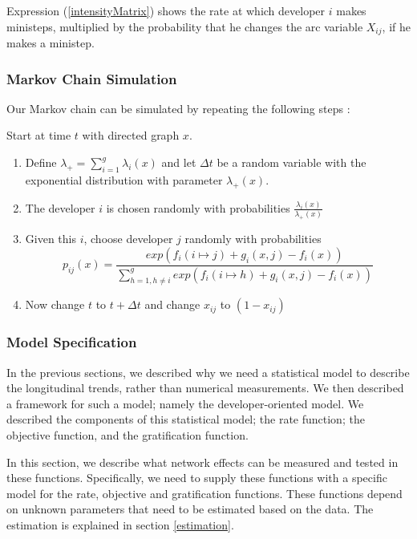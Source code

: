 \documentclass[12pt,letterpaper]{gthesis2}  %
\begin{document}
Expression (\ref{intensityMatrix}) shows the rate at which developer $i$ makes ministeps, multiplied by the probability that he changes the arc variable $X_{ij}$, if he makes a ministep.\\

\subsubsection*{Markov Chain Simulation}
\label{MarkovChainSimulationSteps}
Our Markov chain can be simulated by repeating the following steps \cite{Snijders2004}:

Start at time $t$ with directed graph $x$. 
\begin{enumerate}
\item Define $\lambda_{+} = \sum_{i=1}^g \lambda_i(x)$ and let $\Delta t$ be a random variable with the exponential distribution with parameter $\lambda_{+}(x)$.
\item The developer $i$ is chosen randomly with probabilities $\frac{\lambda_{i}(x)}{\lambda_{+}(x)}$
\item Given this $i$, choose developer $j$ randomly with probabilities 
\begin{equation}
p_{ij}(x) = \frac{exp(f_i(i \mapsto j) + g_i(x, j) - f_i(x))}{\sum_{h=1, h \neq i}^{g} exp(f_i(i \mapsto h) + g_i(x, j) - f_i(x))} \nonumber
\end{equation}
\item Now change $t$ to $t + \Delta t$ and change $x_{ij}$ to $(1 - x_{ij})$
\end{enumerate}

\subsubsection*{Model Specification}
In the previous sections, we described why we need a statistical model to describe the longitudinal trends, rather than numerical measurements. We then described a framework for such a model; namely the developer-oriented model. We described the components of this statistical model; the rate function; the objective function, and the gratification function.

In this section, we describe what network effects can be measured and tested in these functions. Specifically, we need to supply these functions with a specific model for the rate, objective and gratification functions. These functions depend on unknown parameters that need to be estimated based on the data. The estimation is explained in section \ref{estimation}. 
\end{document}
